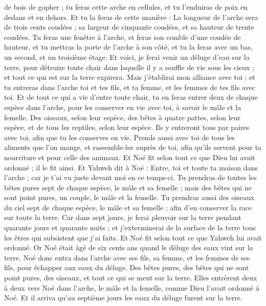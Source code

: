 \begin{multicols}{2}
{} de bois de gopher ; tu feras cette arche en cellules, et tu l'enduiras de poix en dedans et en dehors.
Et tu la feras de cette manière : La longueur de l'arche sera de trois cents coudées ; sa largeur de cinquante coudées, et sa hauteur de trente coudées.
Tu feras une fenêtre à l'arche, et feras son comble d'une coudée de hauteur, et tu mettras la porte de l'arche à son côté, et tu la feras avec un bas, un second, et un troisième étage.
Et voici, je ferai venir un déluge d'eau sur la terre, pour détruire toute chair dans laquelle il y a souffle de vie sous les cieux ; et tout ce qui est sur la terre expirera.
Mais j'établirai mon alliance avec toi ; et tu entreras dans l'arche toi et tes fils, et ta femme, et les femmes de tes fils avec toi.
Et de tout ce qui a vie d'entre toute chair, tu en feras entrer deux de chaque espèce dans l'arche, pour les conserver en vie avec toi, à savoir le mâle et la femelle.
Des oiseaux, selon leur espèce, des bêtes à quatre pattes, selon leur espèce, et de tous les reptiles, selon leur espèce. Ils y entreront tous par paires avec toi, afin que tu les conserves en vie.
Prends aussi avec toi de tous les aliments que l'on mange, et rassemble-les auprès de toi, afin qu'ils servent pour ta nourriture et pour celle des animaux.
Et Noé fit selon tout ce que Dieu lui avait ordonné ; il le fit ainsi.
\VerseOne{}Et Yahweh dit à Noé : Entre, toi et toute ta maison dans l'arche ; car je t'ai vu juste devant moi en ce temps-ci. 
 Tu prendras de toutes les bêtes pures sept de chaque espèce, le mâle et sa femelle ; mais des bêtes qui ne sont point pures, un couple, le mâle et la femelle.
Tu prendras aussi des oiseaux du ciel sept de chaque espèce, le mâle et sa femelle ; afin d'en conserver la race sur toute la terre.
Car dans sept jours, je ferai pleuvoir sur la terre pendant quarante jours et quarante nuits ; et j'exterminerai de la surface de la terre tous les êtres qui subsistent que j'ai faits.
Et Noé fit selon tout ce que Yahweh lui avait ordonné.
Or Noé était âgé de six cents ans quand le déluge des eaux vint sur la terre.
Noé donc entra dans l'arche avec ses fils, sa femme, et les femmes de ses fils, pour échapper aux eaux du déluge.
Des bêtes pures, des bêtes qui ne sont point pures, des oiseaux, et tout ce qui se meut sur la terre.
Elles entrèrent deux à deux vers Noé dans l'arche, le mâle et la femelle, comme Dieu l'avait ordonné à Noé.
Et il arriva qu'au septième jours les eaux du déluge furent sur la terre.

\end{multicols}
